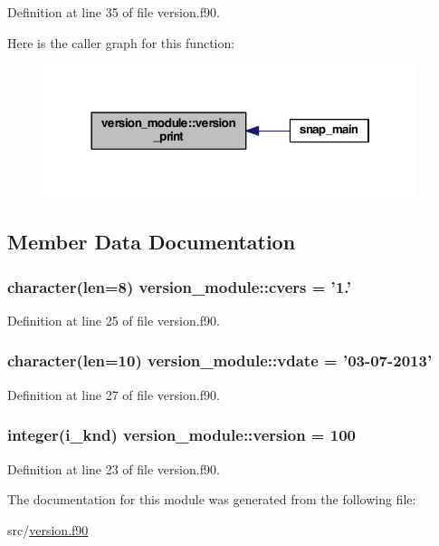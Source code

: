 Definition at line 35 of file version.\-f90.



Here is the caller graph for this function\-:\nopagebreak
\begin{figure}[H]
\begin{center}
\leavevmode
\includegraphics[width=310pt]{classversion__module_a5ed83115741d1afa2856fffc7331a719_icgraph}
\end{center}
\end{figure}




\subsection{Member Data Documentation}
\hypertarget{classversion__module_ad22248c813ff49d5562410a5707d4424}{
\subsubsection[{cvers}]{\setlength{\rightskip}{0pt plus 5cm}character(len=8) version\-\_\-module\-::cvers = '1.'}}\label{classversion__module_ad22248c813ff49d5562410a5707d4424}


Definition at line 25 of file version.\-f90.

\hypertarget{classversion__module_a8ee99e648cd45a2dc8bf148b8e97b32d}{
\subsubsection[{vdate}]{\setlength{\rightskip}{0pt plus 5cm}character(len=10) version\-\_\-module\-::vdate = '03-\/07-\/2013'}}\label{classversion__module_a8ee99e648cd45a2dc8bf148b8e97b32d}


Definition at line 27 of file version.\-f90.

\hypertarget{classversion__module_a55cb5650d5ff58946595f412094ea9ed}{
\subsubsection[{version}]{\setlength{\rightskip}{0pt plus 5cm}integer(i\-\_\-knd) version\-\_\-module\-::version = 100}}\label{classversion__module_a55cb5650d5ff58946595f412094ea9ed}


Definition at line 23 of file version.\-f90.



The documentation for this module was generated from the following file\-:\begin{DoxyCompactItemize}
\item 
src/\hyperlink{version_8f90}{version.\-f90}\end{DoxyCompactItemize}
